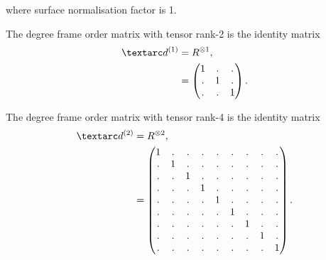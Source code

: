 where surface normalisation factor is 1.



The  degree frame order matrix with tensor rank-2 is the identity matrix
\begin{subequations} \label{eq: rigid 1st degree frame order matrix}
\begin{align}
    \FOone &= R^{\otimes 1} , \\
           &= \begin{pmatrix}
                  1 & . & . \\
                  . & 1 & . \\
                  . & . & 1 \\
              \end{pmatrix}.
\end{align}
\end{subequations}



The  degree frame order matrix with tensor rank-4 is the identity matrix
\begin{subequations} \label{eq: rigid 2nd degree frame order matrix}
\begin{align}
    \FOtwo &= R^{\otimes 2} , \\
           &= \begin{pmatrix}
                  1 & . & . & . & . & . & . & . & . \\
                  . & 1 & . & . & . & . & . & . & . \\
                  . & . & 1 & . & . & . & . & . & . \\
                  . & . & . & 1 & . & . & . & . & . \\
                  . & . & . & . & 1 & . & . & . & . \\
                  . & . & . & . & . & 1 & . & . & . \\
                  . & . & . & . & . & . & 1 & . & . \\
                  . & . & . & . & . & . & . & 1 & . \\
                  . & . & . & . & . & . & . & . & 1 \\
              \end{pmatrix}.
\end{align}
\end{subequations}



